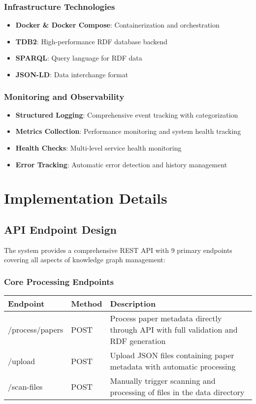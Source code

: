 \documentclass[12pt,a4paper]{article}
\begin{document}
\subsubsection{Infrastructure Technologies}
\begin{itemize}
    \item \textbf{Docker \& Docker Compose}: Containerization and orchestration
    \item \textbf{TDB2}: High-performance RDF database backend
    \item \textbf{SPARQL}: Query language for RDF data
    \item \textbf{JSON-LD}: Data interchange format
\end{itemize}

\subsubsection{Monitoring and Observability}
\begin{itemize}
    \item \textbf{Structured Logging}: Comprehensive event tracking with categorization
    \item \textbf{Metrics Collection}: Performance monitoring and system health tracking
    \item \textbf{Health Checks}: Multi-level service health monitoring
    \item \textbf{Error Tracking}: Automatic error detection and history management
\end{itemize}

\section{Implementation Details}

\subsection{API Endpoint Design}

The system provides a comprehensive REST API with 9 primary endpoints covering all aspects of knowledge graph management:

\subsubsection{Core Processing Endpoints}

\begin{longtable}{|p{3cm}|p{2cm}|p{8cm}|}
\hline
\textbf{Endpoint} & \textbf{Method} & \textbf{Description} \\
\hline
\endhead
/process/papers & POST & Process paper metadata directly through API with full validation and RDF generation \\
\hline
/upload & POST & Upload JSON files containing paper metadata with automatic processing \\
\hline
/scan-files & POST & Manually trigger scanning and processing of files in the data directory \\
\hline
\end{longtable}
\end{document}
